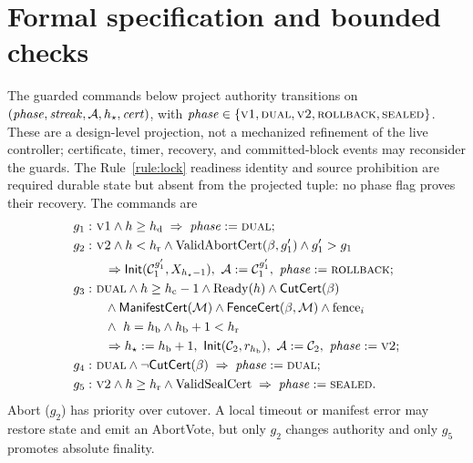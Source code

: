 \section{Formal specification and bounded checks}
\label{app:spec}
The guarded commands below project authority transitions on
$(\mathit{phase},\mathit{streak},\mathcal{A},h_{\star},\mathit{cert})$, with
$\mathit{phase}\in\{\textsc{v1},\textsc{dual},\textsc{v2},\textsc{rollback},\textsc{sealed}\}$.
These are a design-level projection, not a mechanized refinement of the live controller;
certificate, timer, recovery, and committed-block events may reconsider the guards. The
Rule~\ref{rule:lock} readiness identity and source prohibition are required durable state but
absent from the projected tuple: no phase flag proves their recovery. The commands are
\begin{align*}
g_1:&\ \phase{v1}\wedge h\ge\hd \;\Rightarrow\; \mathit{phase}:=\phase{dual};\\
g_2:&\ \phase{v2}\wedge h<\hr\wedge \mathrm{ValidAbortCert}(\beta,g_1')\wedge g_1'>g_1\\
    &\quad\Rightarrow \mathsf{Init}(\Csrc^{g_1'},X_{\hs-1}),\ \Auth:=\Csrc^{g_1'},\ \mathit{phase}:=\phase{rollback};\\
g_3:&\ \phase{dual}\wedge h\ge\hc-1\wedge\mathrm{Ready}(h)\wedge\CutCert(\beta)\\
    &\quad\wedge\ManCert(\mathcal M)\wedge\FenceCert(\beta,\mathcal M)\wedge\mathrm{fence}_i\\
    &\quad\wedge\ h=\hb\wedge\hb+1<\hr\\
    &\quad\Rightarrow \hs:=\hb+1,\ \mathsf{Init}(\Ctgt,r_{\hb}),\ \Auth:=\Ctgt,\ \mathit{phase}:=\phase{v2};\\
g_4:&\ \phase{dual}\wedge\neg\CutCert(\beta)\;\Rightarrow\;\mathit{phase}:=\phase{dual};\\
g_5:&\ \phase{v2}\wedge h\ge\hr\wedge\mathrm{ValidSealCert}\;\Rightarrow\;\mathit{phase}:=\phase{sealed}.
\end{align*}
Abort ($g_2$) has priority over cutover. A local timeout or manifest error may restore state and emit
an AbortVote, but only $g_2$ changes authority and only $g_5$ promotes absolute finality.


